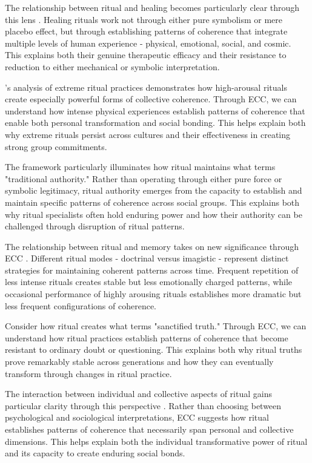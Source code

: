 \begin{refsection}
The relationship between ritual and healing becomes particularly clear through this lens \cite{kapferer1997feast}. Healing rituals work not through either pure symbolism or mere placebo effect, but through establishing patterns of coherence that integrate multiple levels of human experience - physical, emotional, social, and cosmic. This explains both their genuine therapeutic efficacy and their resistance to reduction to either mechanical or symbolic interpretation.

\cite{xygalatas2013burning}'s analysis of extreme ritual practices demonstrates how high-arousal rituals create especially powerful forms of collective coherence. Through ECC, we can understand how intense physical experiences establish patterns of coherence that enable both personal transformation and social bonding. This helps explain both why extreme rituals persist across cultures and their effectiveness in creating strong group commitments.

The framework particularly illuminates how ritual maintains what \cite{bloch1989ritual} terms "traditional authority." Rather than operating through either pure force or symbolic legitimacy, ritual authority emerges from the capacity to establish and maintain specific patterns of coherence across social groups. This explains both why ritual specialists often hold enduring power and how their authority can be challenged through disruption of ritual patterns.

The relationship between ritual and memory takes on new significance through ECC \cite{whitehouse2004modes}. Different ritual modes - doctrinal versus imagistic - represent distinct strategies for maintaining coherent patterns across time. Frequent repetition of less intense rituals creates stable but less emotionally charged patterns, while occasional performance of highly arousing rituals establishes more dramatic but less frequent configurations of coherence.

Consider how ritual creates what \cite{rappaport1999ritual} terms "sanctified truth." Through ECC, we can understand how ritual practices establish patterns of coherence that become resistant to ordinary doubt or questioning. This explains both why ritual truths prove remarkably stable across generations and how they can eventually transform through changes in ritual practice.

The interaction between individual and collective aspects of ritual gains particular clarity through this perspective \cite{collins2004interaction}. Rather than choosing between psychological and sociological interpretations, ECC suggests how ritual establishes patterns of coherence that necessarily span personal and collective dimensions. This helps explain both the individual transformative power of ritual and its capacity to create enduring social bonds.


\end{refsection}
